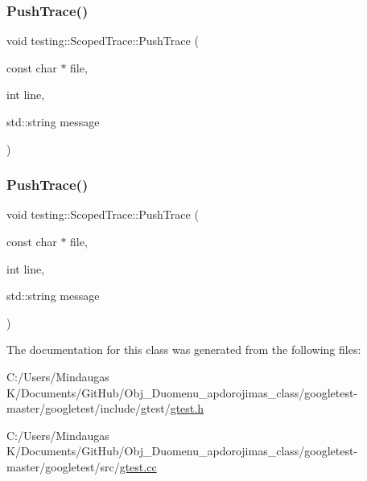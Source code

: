 \subsubsection{\texorpdfstring{PushTrace()}{PushTrace()}\hspace{0.1cm}{\footnotesize\ttfamily [2/3]}}
{\footnotesize\ttfamily void testing\+::\+Scoped\+Trace\+::\+Push\+Trace (\begin{DoxyParamCaption}\item[{const char $\ast$}]{file,  }\item[{int}]{line,  }\item[{std\+::string}]{message }\end{DoxyParamCaption})\hspace{0.3cm}{\ttfamily [private]}}

\mbox{\label{classtesting_1_1_scoped_trace_a905304c342012d6ae1493a1ad3b62255}} 
\subsubsection{\texorpdfstring{PushTrace()}{PushTrace()}\hspace{0.1cm}{\footnotesize\ttfamily [3/3]}}
{\footnotesize\ttfamily void testing\+::\+Scoped\+Trace\+::\+Push\+Trace (\begin{DoxyParamCaption}\item[{const char $\ast$}]{file,  }\item[{int}]{line,  }\item[{std\+::string}]{message }\end{DoxyParamCaption})\hspace{0.3cm}{\ttfamily [private]}}



The documentation for this class was generated from the following files\+:\begin{DoxyCompactItemize}
\item 
C\+:/\+Users/\+Mindaugas K/\+Documents/\+Git\+Hub/\+Obj\+\_\+\+Duomenu\+\_\+apdorojimas\+\_\+class/googletest-\/master/googletest/include/gtest/\mbox{\hyperlink{googletest-master_2googletest_2include_2gtest_2gtest_8h}{gtest.\+h}}\item 
C\+:/\+Users/\+Mindaugas K/\+Documents/\+Git\+Hub/\+Obj\+\_\+\+Duomenu\+\_\+apdorojimas\+\_\+class/googletest-\/master/googletest/src/\mbox{\hyperlink{googletest-master_2googletest_2src_2gtest_8cc}{gtest.\+cc}}\end{DoxyCompactItemize}
